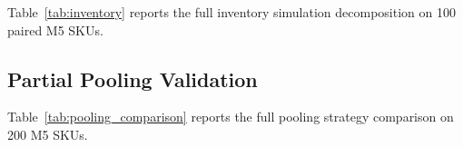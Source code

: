 \documentclass[10pt]{article} %
\theoremstyle{plain}
\theoremstyle{definition}
\begin{document}
Table~\ref{tab:inventory} reports the full inventory simulation decomposition on 100 paired M5 SKUs.

\begin{table}[ht]
\centering
\footnotesize
\setlength{\tabcolsep}{2pt}
\caption{Inventory Simulation Decomposition (M5, 100 SKUs; median), strictly out-of-sample. Cumulative cost (holding + stockout) summed over the 28-day test horizon at $h/p=0.1$: CD = $\$137.7$ per SKU, Tuned XGBoost = $\$103.8$ per SKU. CD's lower holding is outweighed by roughly $2.9\times$ the stockout cost.}
\label{tab:inventory}
\smallskip
\end{table}

\subsection{Partial Pooling Validation}
\label{app:ablation_pooling}

Table~\ref{tab:pooling_comparison} reports the full pooling strategy comparison on 200 M5 SKUs.

\begin{table}[ht]
\centering
\footnotesize
\setlength{\tabcolsep}{2pt}
\caption{Pooling Strategy Comparison (M5, 200 SKUs; mean $\pm$ std)}
\label{tab:pooling_comparison}
\end{table}
\end{document}

